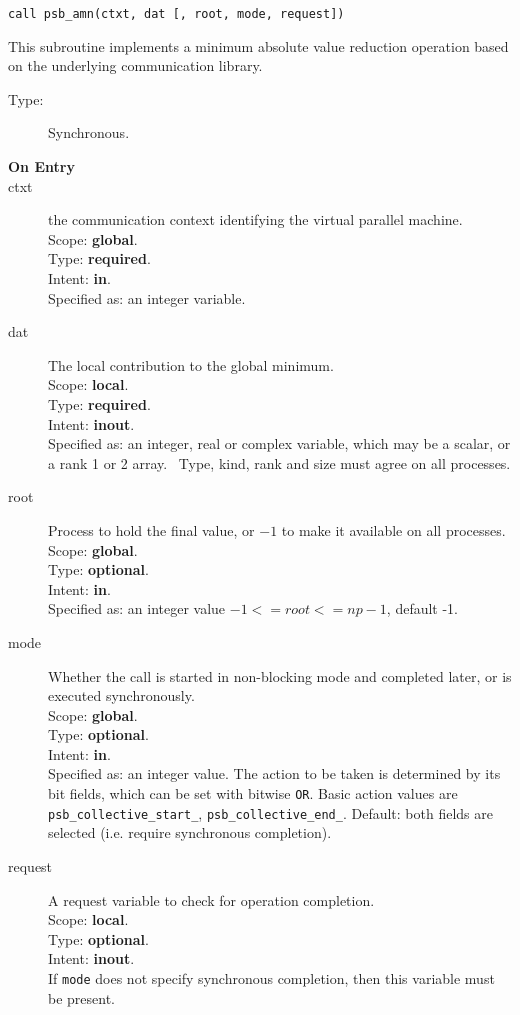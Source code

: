 \begin{verbatim}
call psb_amn(ctxt, dat [, root, mode, request])
\end{verbatim}

This subroutine implements a minimum absolute value reduction
operation based on the underlying communication library. 
\begin{description}
\item[Type:] Synchronous.
\item[\bf  On Entry ]
\item[ctxt] the communication context identifying the virtual
  parallel machine.\\
Scope: {\bf global}.\\
Type: {\bf required}.\\
Intent: {\bf in}.\\
Specified as: an integer variable.
\item[dat] The local contribution to the global minimum.\\
Scope: {\bf local}.\\
Type: {\bf required}.\\
Intent: {\bf inout}.\\
Specified as: an integer, real or complex variable, which may be a
scalar, or a rank 1 or 2 array. \
Type, kind, rank and size must agree on all processes.
\item[root] Process to hold the final value, or $-1$ to make it available
  on all processes.\\
Scope: {\bf global}.\\
Type: {\bf optional}.\\
Intent: {\bf in}.\\
Specified as: an integer value $-1<= root <= np-1$, default -1. \\
\item[mode] Whether the call is started in non-blocking mode and completed
  later, or is executed synchronously.\\
Scope: {\bf global}.\\
Type: {\bf optional}.\\
Intent: {\bf in}.\\
Specified as: an integer value. The action to be taken is determined
by its bit fields, which can be set with bitwise \verb|OR|. Basic
action values are \verb|psb_collective_start_|, \verb|psb_collective_end_|.
Default:  both fields are selected (i.e. require synchronous completion).\\
\item[request] A request variable to check for operation completion.\\
Scope: {\bf local}.\\
Type: {\bf optional}.\\
Intent: {\bf inout}.\\
If \verb|mode| does not specify synchronous completion, then this
variable must be present.
\end{description}


